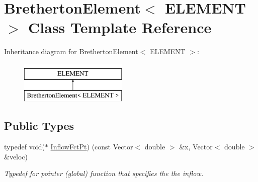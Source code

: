\hypertarget{classBrethertonElement}{}\section{Bretherton\+Element$<$ E\+L\+E\+M\+E\+NT $>$ Class Template Reference}
\label{classBrethertonElement}
Inheritance diagram for Bretherton\+Element$<$ E\+L\+E\+M\+E\+NT $>$\+:\begin{figure}[H]
\begin{center}
\leavevmode
\includegraphics[height=2.000000cm]{classBrethertonElement}
\end{center}
\end{figure}
\subsection*{Public Types}
\begin{DoxyCompactItemize}
\item 
typedef void($\ast$ \hyperlink{classBrethertonElement_a313d868ce6fbd8df07b0360db25133ce}{Inflow\+Fct\+Pt}) (const Vector$<$ double $>$ \&x, Vector$<$ double $>$ \&veloc)
\begin{DoxyCompactList}\small\item\em Typedef for pointer (global) function that specifies the the inflow. \end{DoxyCompactList}\end{DoxyCompactItemize}
